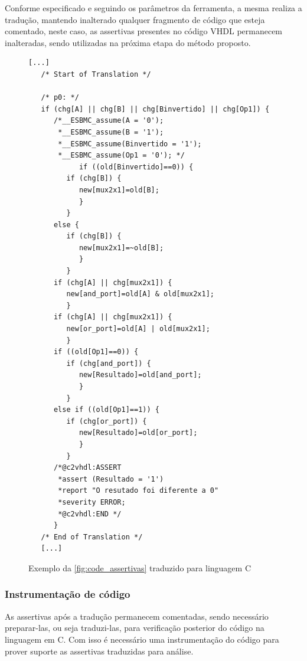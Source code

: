 \par
Conforme especificado e seguindo os parâmetros da ferramenta, a mesma realiza a tradução, mantendo inalterado qualquer fragmento de código que esteja comentado, neste caso, as assertivas presentes no código VHDL permanecem inalteradas, sendo utilizadas na próxima etapa do método proposto.

\begin{figure}[H]
\caption{\label{fig:code_trad} Exemplo da \autoref{fig:code_assertivas} traduzido para linguagem C}
	\begin{center}
    \begin{minipage}{0.7\textwidth}
    \begin{lstlisting}       
[...]
   /* Start of Translation */

   /* p0: */
   if (chg[A] || chg[B] || chg[Binvertido] || chg[Op1]) {
      /*__ESBMC_assume(A = '0');
       *__ESBMC_assume(B = '1');
       *__ESBMC_assume(Binvertido = '1'); 
       *__ESBMC_assume(Op1 = '0'); */
            if ((old[Binvertido]==0)) {
         if (chg[B]) {
            new[mux2x1]=old[B];
            }
         }
      else {
         if (chg[B]) {
            new[mux2x1]=~old[B];
            }
         }
      if (chg[A] || chg[mux2x1]) {
         new[and_port]=old[A] & old[mux2x1];
         }
      if (chg[A] || chg[mux2x1]) {
         new[or_port]=old[A] | old[mux2x1];
         }
      if ((old[Op1]==0)) {
         if (chg[and_port]) {
            new[Resultado]=old[and_port];
            }
         }
      else if ((old[Op1]==1)) {
         if (chg[or_port]) {
            new[Resultado]=old[or_port];
            }
         }
      /*@c2vhdl:ASSERT
       *assert (Resultado = '1')
       *report "O resutado foi diferente a 0"
       *severity ERROR;
       *@c2vhdl:END */
      }
   /* End of Translation */
   [...]
    \end{lstlisting}
    \end{minipage}
	\end{center}
\end{figure}

\subsubsection{Instrumentação de código}

\par
As assertivas após a tradução permanecem comentadas, sendo necessário preparar-las, ou seja traduzi-las, para verificação posterior do código na linguagem em C. Com isso é necessário uma instrumentação do código para prover suporte as assertivas traduzidas para análise.

